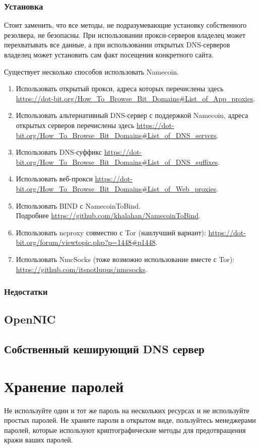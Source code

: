 \begin{enumerate}
\subsubsection{Установка}
\begin{important}
Стоит заменить, что все методы, не подразумевающие установку собственного резолвера, не безопасны. При использовании прокси-серверов владелец может перехватывать все данные, а при использовании открытых DNS-серверов владелец может установить сам факт посещения конкретного сайта.
\end{important}
Существует несколько способов использовать Namecoin.
\begin{enumerate}
\item Использовать открытый прокси, адреса которых перечислены здесь \url{https://dot-bit.org/How_To_Browse_Bit_Domains#List_of_App_proxies}.
\item Использовать альтернативный DNS-сервер с поддержкой Namecoin, адреса открытых серверов перечислены здесь \url{https://dot-bit.org/How_To_Browse_Bit_Domains#List_of_DNS_servers}.
\item Использовать DNS-суффикс \url{https://dot-bit.org/How_To_Browse_Bit_Domains#List_of_DNS_suffixes}.
\item Использовать веб-прокси \url{https://dot-bit.org/How_To_Browse_Bit_Domains#List_of_Web_proxies}.
\item Использовать BIND с NamecoinToBind.\\Подробнее \url{https://github.com/khalahan/NamecoinToBind}.
\item Использовать ncproxy совместно с Tor (наилучший вариант): \url{https://dot-bit.org/forum/viewtopic.php?p=1448#p1448}.
\item Использовать NmcSocks (тоже возможно использование вместе с Tor): \url{https://github.com/itsnotlupus/nmcsocks}.
\end{enumerate}
\subsubsection{Недостатки}
\subsection{OpenNIC}
\subsection{Собственный кеширующий DNS сервер}

\section{Хранение паролей}
\begin{important}
Не используйте один и тот же пароль на нескольких ресурсах и не используйте простых паролей. Не храните пароли в открытом виде, пользуйтесь менеджерами паролей, которые используют криптографические методы для предотвращения кражи ваших паролей.
\end{important}

\end{enumerate}
